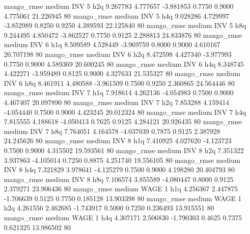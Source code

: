        mango_rmse     medium      INV                 5                  h2q  9.267783 4.777657 -3.881853 0.7750 0.9000  4.775061   21.226945 80
       mango_rmse     medium      INV                 5                  h4q  9.028286 4.729997 -3.852989 0.8250 0.9250  4.389593   22.125840 80
       mango_rmse     medium      INV                 5                  h8q  9.244495 4.850472 -3.862527 0.7750 0.9125  2.288813   24.833876 80
       mango_rmse     medium      INV                 6                  h1q  8.509589 4.528449 -3.969759 0.8000 0.9000  4.610167   20.707198 80
       mango_rmse     medium      INV                 6                  h2q  8.472598 4.427340 -3.977993 0.7750 0.9000  4.589369   20.600245 80
       mango_rmse     medium      INV                 6                  h4q  8.348745 4.422271 -3.959489 0.8125 0.9000  4.327633   21.535327 80
       mango_rmse     medium      INV                 6                  h8q  8.461911 4.480588 -3.961509 0.7500 0.9250  2.360865   24.564446 80
       mango_rmse     medium      INV                 7                  h1q  7.918614 4.262136 -4.054983 0.7500 0.9000  4.467407   20.097890 80
       mango_rmse     medium      INV                 7                  h2q  7.853288 4.159414 -4.054440 0.7500 0.9000  4.423245   20.012324 80
       mango_rmse     medium      INV                 7                  h4q  7.815555 4.188618 -4.050413 0.7625 0.9125  4.284121   20.926435 80
       mango_rmse     medium      INV                 7                  h8q  7.764051 4.164578 -4.037039 0.7875 0.9125  2.387928   24.245626 80
       mango_rmse     medium      INV                 8                  h1q  7.410925 4.027620 -4.123723 0.7500 0.9000  4.315502   19.593561 80
       mango_rmse     medium      INV                 8                  h2q  7.351322 3.937863 -4.105014 0.7250 0.8875  4.251740   19.556105 80
       mango_rmse     medium      INV                 8                  h4q  7.321829 3.978641 -4.125279 0.7500 0.9000  4.198280   20.404793 80
       mango_rmse     medium      INV                 8                  h8q  7.106574 3.855589 -4.080447 0.8000 0.9125  2.379271   23.906436 80
       mango_rmse     medium     WAGE                 1                  h1q  4.256367 2.447875 -1.706639 0.5125 0.7750  0.185128   13.903398 80
       mango_rmse     medium     WAGE                 1                  h2q  4.261556 2.462685 -1.743917 0.5000 0.7250  0.236493   13.915551 80
       mango_rmse     medium     WAGE                 1                  h4q  4.307171 2.506830 -1.790303 0.4625 0.7375  0.621325   13.986502 80
